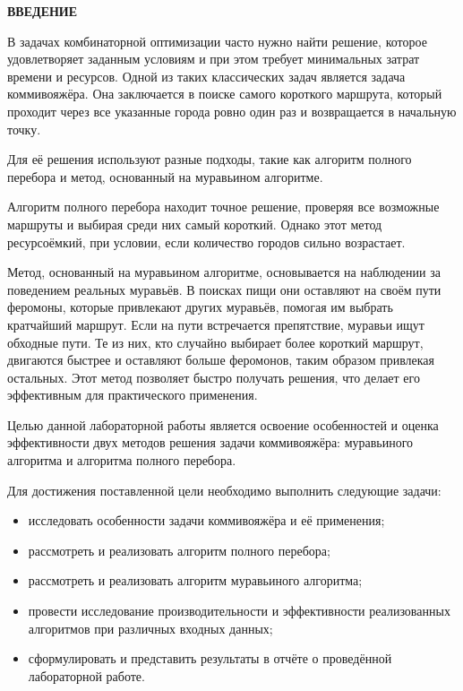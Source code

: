 \begin{center}
  \textbf{ВВЕДЕНИЕ}
\end{center}

В задачах комбинаторной оптимизации часто нужно найти решение, которое удовлетворяет заданным условиям и при этом требует минимальных затрат времени и ресурсов. Одной из таких классических задач является задача коммивояжёра. Она заключается в поиске самого короткого маршрута, который проходит через все указанные города ровно один раз и возвращается в начальную точку.

Для её решения используют разные подходы, такие как алгоритм полного перебора и метод, основанный на муравьином алгоритме.

Алгоритм полного перебора находит точное решение, проверяя все возможные маршруты и выбирая среди них самый короткий. Однако этот метод ресурсоёмкий, при условии, если количество городов сильно возрастает.

Метод, основанный на муравьином алгоритме, основывается на наблюдении за поведением реальных муравьёв. В поисках пищи они оставляют на своём пути феромоны, которые привлекают других муравьёв, помогая им выбрать кратчайший маршрут. Если на пути встречается препятствие, муравьи ищут обходные пути. Те из них, кто случайно выбирает более короткий маршрут, двигаются быстрее и оставляют больше феромонов, таким образом привлекая остальных. Этот метод позволяет быстро получать решения, что делает его эффективным для практического применения.



Целью данной лабораторной работы является освоение особенностей и оценка эффективности двух методов решения задачи коммивояжёра: муравьиного алгоритма и алгоритма полного перебора.

Для достижения поставленной цели необходимо выполнить следующие задачи:
\begin{itemize}
  \item исследовать особенности задачи коммивояжёра и её применения;
  \item рассмотреть и реализовать алгоритм полного перебора;
  \item рассмотреть и реализовать алгоритм муравьиного алгоритма;
  \item провести исследование производительности и эффективности реализованных алгоритмов при различных входных данных;
  \item сформулировать и представить результаты в отчёте о проведённой лабораторной работе.
\end{itemize}

